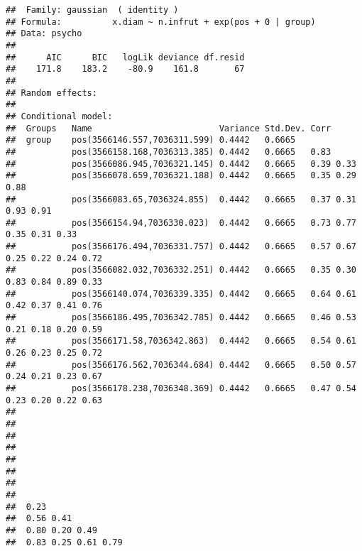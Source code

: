 \documentclass[
]{book}
\begin{document}
\begin{verbatim}
##  Family: gaussian  ( identity )
## Formula:          x.diam ~ n.infrut + exp(pos + 0 | group)
## Data: psycho
## 
##      AIC      BIC   logLik deviance df.resid 
##    171.8    183.2    -80.9    161.8       67 
## 
## Random effects:
## 
## Conditional model:
##  Groups   Name                         Variance Std.Dev. Corr                         
##  group    pos(3566146.557,7036311.599) 0.4442   0.6665                                
##           pos(3566158.168,7036313.385) 0.4442   0.6665   0.83                         
##           pos(3566086.945,7036321.145) 0.4442   0.6665   0.39 0.33                    
##           pos(3566078.659,7036321.188) 0.4442   0.6665   0.35 0.29 0.88               
##           pos(3566083.65,7036324.855)  0.4442   0.6665   0.37 0.31 0.93 0.91          
##           pos(3566154.94,7036330.023)  0.4442   0.6665   0.73 0.77 0.35 0.31 0.33     
##           pos(3566176.494,7036331.757) 0.4442   0.6665   0.57 0.67 0.25 0.22 0.24 0.72
##           pos(3566082.032,7036332.251) 0.4442   0.6665   0.35 0.30 0.83 0.84 0.89 0.33
##           pos(3566140.074,7036339.335) 0.4442   0.6665   0.64 0.61 0.42 0.37 0.41 0.76
##           pos(3566186.495,7036342.785) 0.4442   0.6665   0.46 0.53 0.21 0.18 0.20 0.59
##           pos(3566171.58,7036342.863)  0.4442   0.6665   0.54 0.61 0.26 0.23 0.25 0.72
##           pos(3566176.562,7036344.684) 0.4442   0.6665   0.50 0.57 0.24 0.21 0.23 0.67
##           pos(3566178.238,7036348.369) 0.4442   0.6665   0.47 0.54 0.23 0.20 0.22 0.63
##                                                                                      
##                                                                                      
##                                                                                      
##                                                                                      
##                                                                                      
##                                                                                      
##                                                                                      
##                                                                                      
##  0.23                                                                                
##  0.56 0.41                                                                           
##  0.80 0.20 0.49                                                                      
##  0.83 0.25 0.61 0.79                                                                 

\end{verbatim}
\end{document}

